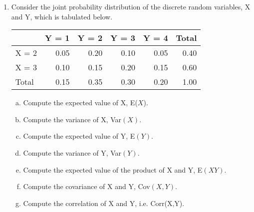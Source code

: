 \documentclass[a4paper,12pt]{article}
\begin{document}
\begin{enumerate}
  
\item Consider the joint probability distribution of the discrete random variables, X and Y, which is tabulated below.
\begin{table}[ht]
\centering
\begin{tabular}{|l|r|r|r|r|r|}
\hline
& Y = 1 & Y = 2 & Y = 3 &Y = 4& Total \\ 
\hline \hline 

X = 2 & 0.05 & 0.20 & 0.10 & 0.05 & 0.40 \\ \hline 
X = 3 & 0.10 & 0.15 & 0.20 & 0.15 & 0.60\\ \hline 
Total & 0.15 & 0.35 & 0.30 &  0.20 &1.00 \\ 
\hline
\end{tabular}
\end{table}
\begin{enumerate}[(a)]
\item  Compute the expected value of X, E($X$).

\item  Compute the variance of X, Var$(X)$.

\item  Compute the expected value of Y, E$(Y)$.

\item  Compute the variance of Y, Var$(Y)$.

\item  Compute the expected value of the product of X and Y, E$(XY)$.

\item  Compute the covariance of X and Y, Cov$(X,Y)$.

\item   Compute the correlation of X and Y, i.e. Corr(X,Y).
\end{enumerate}


\end{enumerate}
\end{document}
